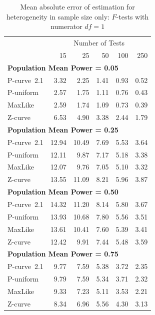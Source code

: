 \documentclass[jou]{apa6} %
\begin{document}
\begin{table} %
\caption{Mean absolute error of estimation for heterogeneity in sample size only: $F$-tests with numerator $df=1$}
{\small
\begin{center}
\begin{tabular}{lrrrrr}  \hline
      & \multicolumn{5}{c}{Number of Tests} \\
      &  15 & 25 & 50 & 100 & 250 \\ \hline
      \multicolumn{6}{l}{\textbf{Population Mean Power = 0.05}} \\ \hline
P-curve~2.1    & 3.32  & 2.25  & 1.41  & 0.93  & 0.52 \\
P-uniform  & 2.57  & 1.75  & 1.11  & 0.76  & 0.43 \\
MaxLike    & 2.59  & 1.74  & 1.09  & 0.73  & 0.39 \\
Z-curve    & 6.53  & 4.90  & 3.38  & 2.44  & 1.79 \\ \hline
\multicolumn{6}{l}{\textbf{Population Mean Power = 0.25}} \\ \hline
P-curve~2.1   & 12.94 & 10.49  & 7.69  & 5.53  & 3.64 \\
P-uniform & 12.11  & 9.87  & 7.17  & 5.18  & 3.38 \\
MaxLike   & 12.07  & 9.76  & 7.05  & 5.10  & 3.32 \\
Z-curve   & 13.55 & 11.09  & 8.21  & 5.96  & 3.87 \\ \hline
\multicolumn{6}{l}{\textbf{Population Mean Power = 0.50}} \\ \hline
P-curve~2.1   & 14.32 & 11.20  & 8.14  & 5.80  & 3.67 \\
P-uniform & 13.93 & 10.68  & 7.80  & 5.56  & 3.51 \\
MaxLike   & 13.61 & 10.41  & 7.60  & 5.39  & 3.41 \\
Z-curve   & 12.42 &  9.91  & 7.44  & 5.48  & 3.59 \\ \hline
\multicolumn{6}{l}{\textbf{Population Mean Power = 0.75}} \\ \hline
P-curve~2.1    & 9.77  & 7.59  & 5.38  & 3.72  & 2.35 \\
P-uniform  & 9.79  & 7.59  & 5.34  & 3.71  & 2.32 \\
MaxLike    & 9.33  & 7.23  & 5.11  & 3.53  & 2.21 \\
Z-curve    & 8.34  & 6.96  & 5.56  & 4.30  & 3.13 \\ \hline
\end{tabular}
\end{center}
} %
\label{heteroNabserrF}  %
\end{table}
\end{document}
